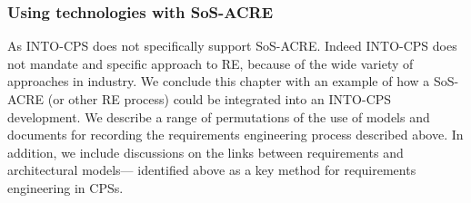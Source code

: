 \subsubsection{Using technologies with SoS-ACRE}


As INTO-CPS does not specifically support SoS-ACRE. Indeed INTO-CPS does not mandate and specific approach to RE, because of the wide variety of approaches in industry. We conclude this chapter with an example of how a SoS-ACRE (or other RE process) could be integrated into an INTO-CPS development. We describe a range of permutations of the use of models and documents for recording the requirements engineering process described above. In addition, we include discussions on the links between requirements and architectural models--- identified above as a key method for requirements engineering in CPSs. %

